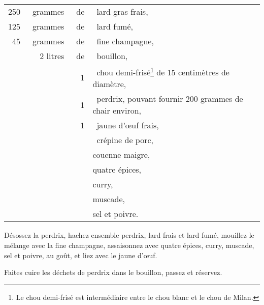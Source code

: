 \footnotesize
\begin{longtable}{rrrp{16em}}
    250 & grammes  & de & lard gras frais,                                                                \\
    125 & grammes  & de & lard fumé,                                                                      \\
     45 & grammes  & de & fine champagne,                                                                 \\
        & 2 litres & de & bouillon,                                                                       \\
        &          &  1 & chou demi-frisé\footnote{Le chou demi-frisé est intermédiaire
                          entre le chou blanc et le chou de Milan.} de 15 centimètres de diamètre,        \\
        &          &  1 & perdrix, pouvant fournir 200 grammes de chair environ,                          \\
        &          &  1 & jaune d'œuf frais,                                                              \\
        &          &    & crépine de porc,                                                                \\
        &          &    & couenne maigre,                                                                 \\
        &          &    & quatre épices,                                                                  \\
        &          &    & curry,                                                                          \\
        &          &    & muscade,                                                                        \\
        &          &    & sel et poivre.                                                                  \\
\end{longtable}
\normalsize

Désossez la perdrix, hachez ensemble perdrix, lard frais et lard fumé, mouillez
le mélange avec la fine champagne, assaisonnez avec quatre épices, curry,
muscade, sel et poivre, au goût, et liez avec le jaune d'œuf.

Faites cuire les déchets de perdrix dans le bouillon, passez et réservez.

